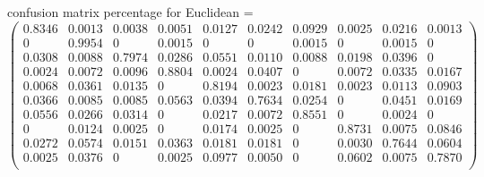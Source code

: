 \documentclass{article}
\begin{document}
\bigskip
confusion matrix percentage for Euclidean = 
$ 
\begin{pmatrix} 
    0.8346  &   0.0013  &   0.0038    & 0.0051   &  0.0127    & 0.0242   &  0.0929  &   0.0025  &   0.0216  &   0.0013 \\
         0   &  0.9954    &      0    & 0.0015   &       0     &     0    & 0.0015    &     0    & 0.0015   &       0\\
    0.0308   &  0.0088  &   0.7974  &   0.0286  &   0.0551   &  0.0110   &  0.0088   &  0.0198  &   0.0396     &     0\\
    0.0024   &  0.0072    & 0.0096  &   0.8804 &    0.0024  &   0.0407       &   0   &  0.0072 &    0.0335 &    0.0167\\
    0.0068 &    0.0361  &   0.0135   &       0   &  0.8194  &   0.0023&     0.0181  &   0.0023 &    0.0113 &    0.0903\\
    0.0366  &   0.0085  &   0.0085   &  0.0563 &    0.0394   &  0.7634  &   0.0254      &    0    & 0.0451   &  0.0169\\
    0.0556  &   0.0266  &   0.0314    &      0   &  0.0217   &  0.0072&     0.8551 &         0& 0.0024  &        0\\
         0  &   0.0124 &    0.0025  &        0   &  0.0174 &    0.0025    &     0    & 0.8731 &    0.0075   &  0.0846\\
    0.0272    & 0.0574 &    0.0151  &   0.0363  &   0.0181   &  0.0181     &     0&     0.0030  &   0.7644   &  0.0604\\
    0.0025  &   0.0376  &        0  &   0.0025   &  0.0977 &    0.0050      &    0   &  0.0602   &  0.0075  &   0.7870\\
\end{pmatrix} $
\\
\end{document}
